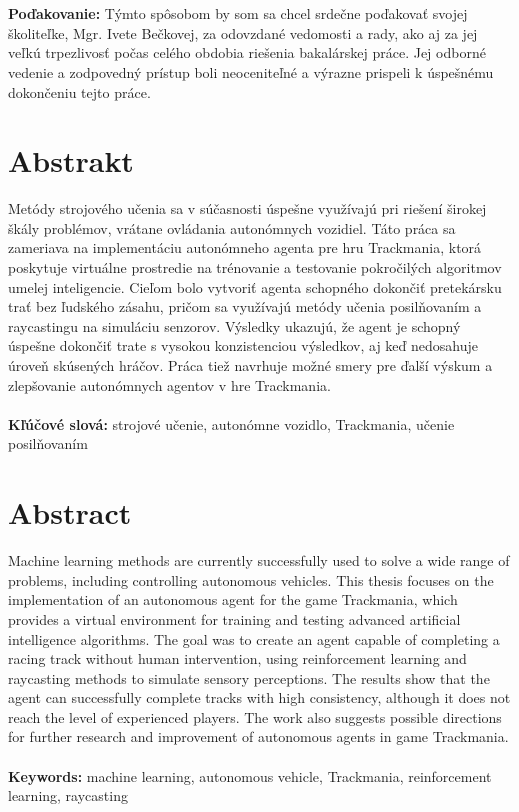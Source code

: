 \documentclass[12pt, twoside]{book}
\begin{document}
\newpage 
\noindent 
\pagestyle{empty}
~


\newpage 
\pagestyle{plain}
~

\vfill
{\bf Poďakovanie:} Týmto spôsobom by som sa chcel srdečne poďakovať svojej školiteľke, Mgr. Ivete Bečkovej, za odovzdané vedomosti a rady, ako aj za jej veľkú trpezlivosť počas celého obdobia riešenia bakalárskej práce. Jej odborné vedenie a zodpovedný prístup boli neoceniteľné a výrazne prispeli k úspešnému dokončeniu tejto práce.


\newpage 
\section*{Abstrakt}

Metódy strojového učenia sa v súčasnosti úspešne využívajú pri riešení širokej škály problémov, vrátane ovládania autonómnych vozidiel. Táto práca sa zameriava na implementáciu autonómneho agenta pre hru Trackmania, ktorá poskytuje virtuálne prostredie na trénovanie a testovanie pokročilých algoritmov umelej inteligencie. Cieľom bolo vytvoriť agenta schopného dokončiť pretekársku trať bez ľudského zásahu, pričom sa využívajú metódy učenia posilňovaním a raycastingu na simuláciu senzorov. Výsledky ukazujú, že agent je schopný úspešne dokončiť trate s vysokou konzistenciou výsledkov, aj keď nedosahuje úroveň skúsených hráčov. Práca tiež navrhuje možné smery pre ďalší výskum a zlepšovanie autonómnych agentov v hre Trackmania.
\\
\\
\textbf{Kľúčové slová:} strojové učenie, autonómne vozidlo, Trackmania, učenie posilňovaním



\newpage 
\section*{Abstract}

Machine learning methods are currently successfully used to solve a wide range of problems, including controlling autonomous vehicles. This thesis focuses on the implementation of an autonomous agent for the game Trackmania, which provides a virtual environment for training and testing advanced artificial intelligence algorithms. The goal was to create an agent capable of completing a racing track without human intervention, using reinforcement learning and raycasting methods to simulate sensory perceptions. The results show that the agent can successfully complete tracks with high consistency, although it does not reach the level of experienced players. The work also suggests possible directions for further research and improvement of autonomous agents in game Trackmania.
\\
\\
\textbf{Keywords:} machine learning, autonomous vehicle, Trackmania, reinforcement learning, raycasting
\end{document}
